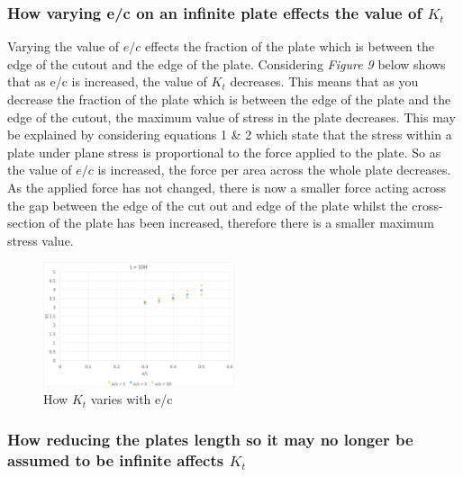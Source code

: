 \documentclass[11pt,twocolumn]{article} %
\begin{document}
\subsubsection{How varying e/c on an infinite plate effects the value of $K_{t}$}
Varying the value of $e/c$ effects the fraction of the plate which is between the edge of the cutout and the edge of the plate. Considering \textit{Figure 9} below shows that as e/c is increased, the value of $K_{t}$ decreases. This means that as you decrease the fraction of the plate which is between the edge of the plate and the edge of the cutout, the maximum value of stress in the plate decreases. This may be explained by considering equations 1 \& 2 which state that the stress within a plate under plane stress is proportional to the force applied to the plate. So as the value of $e/c$ is increased, the force per area across the whole plate decreases. As the applied force has not changed, there is now a smaller force acting across the gap between the edge of the cut out and edge of the plate whilst the cross-section of the plate has been increased, therefore there is a smaller maximum stress value. 
\begin{figure}[!ht]
\centering
\includegraphics[width=0.5\textwidth]{ec.png}
\caption{How $K_{t}$ varies with e/c}
\end{figure}
 
\subsubsection{How reducing the plates length so it may no longer be assumed to be infinite affects $K_{t}$}
\end{document}
